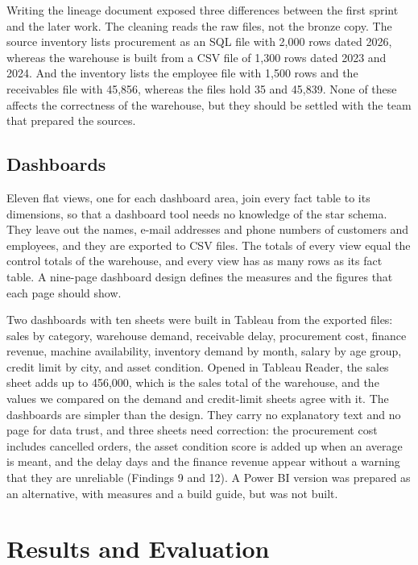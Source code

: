 \documentclass[12pt,a4paper]{report}
\begin{document}
Writing the lineage document exposed three differences between the first sprint and the later work. The cleaning reads the raw files, not the bronze copy. The source inventory lists procurement as an SQL file with 2,000 rows dated 2026, whereas the warehouse is built from a CSV file of 1,300 rows dated 2023 and 2024. And the inventory lists the employee file with 1,500 rows and the receivables file with 45,856, whereas the files hold 35 and 45,839. None of these affects the correctness of the warehouse, but they should be settled with the team that prepared the sources.

\section{Dashboards}\label{sec:dashboards}
Eleven flat views, one for each dashboard area, join every fact table to its dimensions, so that a dashboard tool needs no knowledge of the star schema. They leave out the names, e-mail addresses and phone numbers of customers and employees, and they are exported to CSV files. The totals of every view equal the control totals of the warehouse, and every view has as many rows as its fact table. A nine-page dashboard design defines the measures and the figures that each page should show.

Two dashboards with ten sheets were built in Tableau from the exported files: sales by category, warehouse demand, receivable delay, procurement cost, finance revenue, machine availability, inventory demand by month, salary by age group, credit limit by city, and asset condition. Opened in Tableau Reader, the sales sheet adds up to 456,000, which is the sales total of the warehouse, and the values we compared on the demand and credit-limit sheets agree with it. The dashboards are simpler than the design. They carry no explanatory text and no page for data trust, and three sheets need correction: the procurement cost includes cancelled orders, the asset condition score is added up when an average is meant, and the delay days and the finance revenue appear without a warning that they are unreliable (Findings 9 and 12). A Power BI version was prepared as an alternative, with measures and a build guide, but was not built.

\chapter{Results and Evaluation}\label{ch:results}
\end{document}

